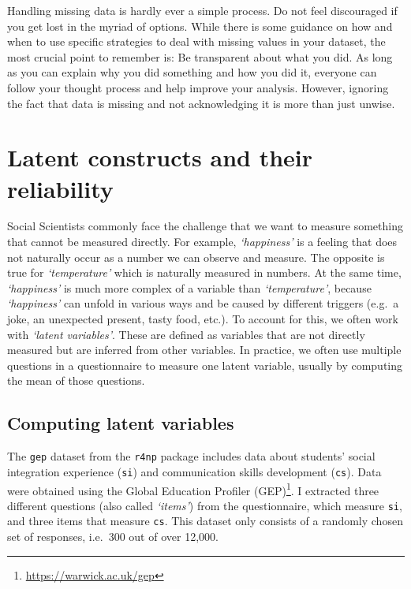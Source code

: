 \documentclass[
  letterpaper,
]{krantz}
\renewcommand{\href}[2]{#2\footnote{\url{#1}}}
\begin{document}
Handling missing data is hardly ever a simple process. Do not feel
discouraged if you get lost in the myriad of options. While there is
some guidance on how and when to use specific strategies to deal with
missing values in your dataset, the most crucial point to remember is:
Be transparent about what you did. As long as you can explain why you
did something and how you did it, everyone can follow your thought
process and help improve your analysis. However, ignoring the fact that
data is missing and not acknowledging it is more than just unwise.

\section{Latent constructs and their
reliability}\label{latent-constructs}

Social Scientists commonly face the challenge that we want to measure
something that cannot be measured directly. For example,
\emph{`happiness'} is a feeling that does not naturally occur as a
number we can observe and measure. The opposite is true for
\emph{`temperature'} which is naturally measured in numbers. At the same
time, \emph{`happiness'} is much more complex of a variable than
\emph{`temperature'}, because \emph{`happiness'} can unfold in various
ways and be caused by different triggers (e.g.~a joke, an unexpected
present, tasty food, etc.). To account for this, we often work with
\emph{`latent variables'}. These are defined as variables that are not
directly measured but are inferred from other variables. In practice, we
often use multiple questions in a questionnaire to measure one latent
variable, usually by computing the mean of those questions.

\subsection{Computing latent
variables}\label{computing-latent-variables}

The \texttt{gep} dataset from the \texttt{r4np} package includes data
about students' social integration experience (\texttt{si}) and
communication skills development (\texttt{cs}). Data were obtained using
the \href{https://warwick.ac.uk/gep}{Global Education Profiler (GEP)}. I
extracted three different questions (also called \emph{`items'}) from
the questionnaire, which measure \texttt{si}, and three items that
measure \texttt{cs}. This dataset only consists of a randomly chosen set
of responses, i.e.~300 out of over 12,000.
\end{document}
